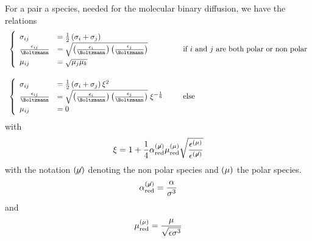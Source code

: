 For a pair a species, needed for the molecular binary diffusion, we have the relations
\begin{equation}
\begin{array}{l@{\qquad}l}
\renewcommand{\arraystretch}{1.2}
\left\{\begin{array}{l@{\quad}l}
  \LJdia_{ij}                      & = \frac{1}{2}\left(\LJdia_{i} + \LJdia_{j}\right) \\
  \frac{\LJdepth_{ij}}{\Boltzmann} & = \sqrt{\left(\frac{\LJdepth_{i}}{\Boltzmann}\right)\left(\frac{\LJdepth_{j}}{\Boltzmann}\right)} \\
  \dipole_{ij}                     & = \sqrt{\dipole_j\dipole_k}\\
\end{array}\right. & 
  \text{if $i$ and $j$ are both polar or non polar} \\\\
\left\{\begin{array}{l@{\quad}l}
  \LJdia_{ij}                      & = \frac{1}{2}\left(\LJdia_{i} + \LJdia_{j}\right) \xi^2 \\
  \frac{\LJdepth_{ij}}{\Boltzmann} & = \sqrt{\left(\frac{\LJdepth_{i}}{\Boltzmann}\right)\left(\frac{\LJdepth_{j}}{\Boltzmann}\right)}\; \xi^{-\frac{1}{6}} \\
  \dipole_{ij}                     & = 0\\
\end{array}\right. & 
  \text{else} \\
\end{array}
\label{LJ_reduced_parameters}
\end{equation}
with
\begin{equation}
\xi = 1 + \frac{1}{4}\polarizability^{(\not{\dipole})}_\text{red}\dipole^{(\dipole)}_\text{red}\sqrt{\frac{\LJdepth^{(\dipole)}}{\LJdepth^{(\not{\dipole})}}}
\label{reduced_parameter:xi}
\end{equation}
with the notation $(\not\!\!\dipole)$ denoting the non polar
species and $(\dipole)$ the polar species.
\begin{equation}
\polarizability_\text{red}^{(\not{\dipole})} = \frac{\polarizability}{\LJdia^3}
\label{reduced_parameter:pol_non_pol:polarizability}
\end{equation}
and
\begin{equation}
\dipole_\text{red}^{(\dipole)} = \frac{\dipole}{\sqrt{\LJdepth\LJdia^3}}
\label{reduced_parameter:pol_non_pol:dipole}
\end{equation}
